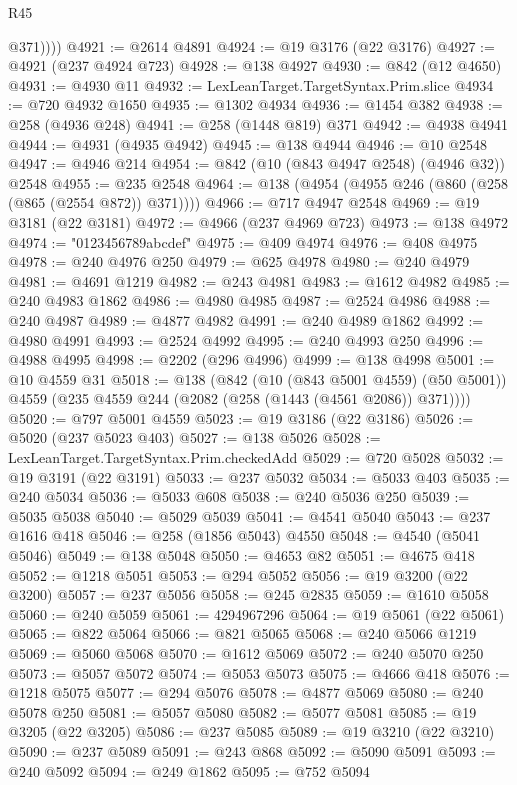 \begin{lexlean}{R45}
\begin{coremodule}
{            @371))))
@4921 := @2614 @4891
@4924 := @19 @3176 (@22 @3176)
@4927 := @4921 (@237 @4924 @723)
@4928 := @138 @4927
@4930 := @842 (@12 @4650)
@4931 := @4930 @11
@4932 := LexLeanTarget.TargetSyntax.Prim.slice
@4934 := @720 @4932 @1650
@4935 := @1302 @4934
@4936 := @1454 @382
@4938 := @258 (@4936 @248)
@4941 := @258 (@1448 @819) @371
@4942 := @4938 @4941
@4944 := @4931 (@4935 @4942)
@4945 := @138 @4944
@4946 := @10 @2548
@4947 := @4946 @214
@4954 := @842 (@10 (@843 @4947 @2548) (@4946 @32)) @2548
@4955 := @235 @2548
@4964 := @138 (@4954 (@4955 @246 (@860 (@258 (@865 (@2554 @872)) @371))))
@4966 := @717 @4947 @2548
@4969 := @19 @3181 (@22 @3181)
@4972 := @4966 (@237 @4969 @723)
@4973 := @138 @4972
@4974 := "0123456789abcdef"
@4975 := @409 @4974
@4976 := @408 @4975
@4978 := @240 @4976 @250
@4979 := @625 @4978
@4980 := @240 @4979
@4981 := @4691 @1219
@4982 := @243 @4981
@4983 := @1612 @4982
@4985 := @240 @4983 @1862
@4986 := @4980 @4985
@4987 := @2524 @4986
@4988 := @240 @4987
@4989 := @4877 @4982
@4991 := @240 @4989 @1862
@4992 := @4980 @4991
@4993 := @2524 @4992
@4995 := @240 @4993 @250
@4996 := @4988 @4995
@4998 := @2202 (@296 @4996)
@4999 := @138 @4998
@5001 := @10 @4559 @31
@5018 := @138
    (@842
      (@10 (@843 @5001 @4559) (@50 @5001))
      @4559
      (@235 @4559 @244 (@2082 (@258 (@1443 (@4561 @2086)) @371))))
@5020 := @797 @5001 @4559
@5023 := @19 @3186 (@22 @3186)
@5026 := @5020 (@237 @5023 @403)
@5027 := @138 @5026
@5028 := LexLeanTarget.TargetSyntax.Prim.checkedAdd
@5029 := @720 @5028
@5032 := @19 @3191 (@22 @3191)
@5033 := @237 @5032
@5034 := @5033 @403
@5035 := @240 @5034
@5036 := @5033 @608
@5038 := @240 @5036 @250
@5039 := @5035 @5038
@5040 := @5029 @5039
@5041 := @4541 @5040
@5043 := @237 @1616 @418
@5046 := @258 (@1856 @5043) @4550
@5048 := @4540 (@5041 @5046)
@5049 := @138 @5048
@5050 := @4653 @82
@5051 := @4675 @418
@5052 := @1218 @5051
@5053 := @294 @5052
@5056 := @19 @3200 (@22 @3200)
@5057 := @237 @5056
@5058 := @245 @2835
@5059 := @1610 @5058
@5060 := @240 @5059
@5061 := 4294967296
@5064 := @19 @5061 (@22 @5061)
@5065 := @822 @5064
@5066 := @821 @5065
@5068 := @240 @5066 @1219
@5069 := @5060 @5068
@5070 := @1612 @5069
@5072 := @240 @5070 @250
@5073 := @5057 @5072
@5074 := @5053 @5073
@5075 := @4666 @418
@5076 := @1218 @5075
@5077 := @294 @5076
@5078 := @4877 @5069
@5080 := @240 @5078 @250
@5081 := @5057 @5080
@5082 := @5077 @5081
@5085 := @19 @3205 (@22 @3205)
@5086 := @237 @5085
@5089 := @19 @3210 (@22 @3210)
@5090 := @237 @5089
@5091 := @243 @868
@5092 := @5090 @5091
@5093 := @240 @5092
@5094 := @249 @1862
@5095 := @752 @5094
}
\end{coremodule}
\end{lexlean}
